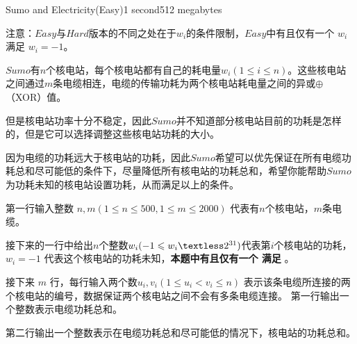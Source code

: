 \documentclass[11pt,a4paper,oneside]{article}
\begin{document}
\begin{problem}{Sumo and Electricity(Easy)}{}{}{1 second}{512 megabytes}
	
	{
		注意：$Easy$与$Hard$版本的不同之处在于$w_i$的条件限制，$Easy$中有且仅有一个 $w_i$ 满足 $w_i = -1 $。
	}
	
	$Sumo$有$n$个核电站，每个核电站都有自己的耗电量$w_i(1\leq i\leq n)$。这些核电站之间通过$m$条电缆相连，电缆的传输功耗为两个核电站耗电量之间的异或$\oplus$（XOR）值。
	
	但是核电站功率十分不稳定，因此$Sumo$并不知道部分核电站目前的功耗是怎样的，但是它可以选择调整这些核电站功耗的大小。
	
	因为电缆的功耗远大于核电站的功耗，因此$Sumo$希望可以优先保证在所有电缆功耗总和尽可能低的条件下，尽量降低所有核电站的功耗总和，希望你能帮助$Sumo$为功耗未知的核电站设置功耗，从而满足以上的条件。
	
	\InputFile
	第一行输入整数 $n,m(1\leq n \leq 500,1\leq m \leq 2000)$ 代表有$n$个核电站，$m$条电缆。
	
	接下来的一行中给出$n$个整数$w_i( -1 \leq w_i \textless 2^{31})$代表第$i$个核电站的功耗，$w_i = -1$ 代表这个核电站的功耗未知，\textbf{本题中有且仅有一个 满足 }。
	
	接下来 $m$ 行，每行输入两个数$u_i,v_i(1 \leq u_i<v_i \leq n)$ 表示该条电缆所连接的两个核电站的编号，数据保证两个核电站之间不会有多条电缆连接。
	\OutputFile
	第一行输出一个整数表示电缆功耗总和。
	
	第二行输出一个整数表示在电缆功耗总和尽可能低的情况下，核电站的功耗总和。
	\Examples
	\begin{example}
	\end{example}
	
	
\end{problem}
\end{document}

